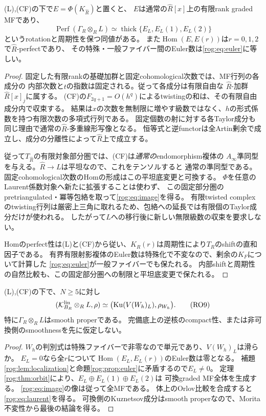 \begin{lemma}[有限対象への制限とLaurent局所化]\label{rog:lem:localization}
\textup{(L),(CF)}の下で$E=\Phi(K_{\widehat R})$と置くと、
$E$は通常の$\widehat R[x]$上の有限rank graded MFであり、
\[
 \operatorname{Perf}(\Gamma_R\otimes_RL)
 \simeq\operatorname{thick}\{E_L,E_L(1),E_L(2)\}
 \tag{RO8}\label{rog:eq:image}
\]
というrotationと周期性を保つ同値がある。
また$\operatorname{Hom}(E,E(r))$は$r=0,1,2$で$\widehat R$-perfectであり、
その特殊・一般ファイバー間のEuler数は\eqref{rog:eq:euler}に等しい。
\end{lemma}
\begin{proof}
固定した有限rankの基礎加群と固定cohomological次数では、MF行列の各成分の
内部次数と$t$の指数は固定される。従って各成分は有限自由な
$\widehat R$-加群$\widehat R[x]_j$に属する。
(CF)の$F_{2q+1}=O(h^q)$によるtwistingの和は、その有限自由成分内で収束する。
結果は$x$の次数を無制限に増やす級数ではなく、$h$の形式係数を持つ有限次数の多項式行列である。
固定個数の射に対する各Taylor成分も同じ理由で通常の$\widehat R$-多重線形写像となる。
恒等式と逆functorは全Artin剰余で成立し、成分の分離性によって$\widehat R$上で成立する。

従って$T_{\widehat R}$の有限対象部分圏では、(CF)は\emph{通常の}endomorphism複体の
$A_\infty$準同型を与える。$\widehat R\to L$は平坦なので、これをテンソルすると
通常の準同型である。固定cohomological次数のHomの形成はこの平坦底変更と可換する。
$\Phi$を任意のLaurent係数対象へ新たに拡張することは使わず、
この固定部分圏のpretriangulated・冪等包絡を取って\eqref{rog:eq:image}を得る。
有限twisted complexのtwisting行列は厳密上三角に取れるため、包絡への延長では有限個のTaylor成分だけが使われる。
したがって$L$への移行後に新しい無限級数の収束を要求しない。

Homのperfect性は(L)と(CF)から従い、$K_R(r)$は周期性により$T_R$のshiftの直和因子である。
有界有限射影複体のEuler数は特殊化で不変なので、剰余の$K_F$について計算した
\eqref{rog:eq:euler}が一般ファイバーでも保たれる。
内部shiftと周期性の自然比較も、この固定部分圏への制限と平坦底変更で保たれる。
\end{proof}

\begin{theorem}[Laurent体上の生成性と可換復元]\label{rog:thm:laurent}
\textup{(L),(CF)}の下で、$N\ge5$に対し
\[
 (\mathcal K^{\rm lin}_{B_R}\otimes_RL,\rho)
 \simeq\bigl(\operatorname{Ku}(V(W_h)_L),\rho_{W_h}\bigr).
 \tag{RO9}\label{rog:eq:laurent}
\]
特に$\Gamma_R\otimes_RL$はsmooth properである。
完備底上の逆核のcompact性、または非可換側のsmoothnessを先に仮定しない。
\end{theorem}
\begin{proof}
$W_h$の判別式は特殊ファイバーで非零なので単元であり、$V(W_h)_L$は滑らか。
$E_L=0$なら全$r$について$\operatorname{Hom}(E_L,E_L(r))$のEuler数は零となる。
補題\ref{rog:lem:localization}と命題\ref{rog:prop:euler}に矛盾するので$E_L\ne0$。
定理\ref{rog:thm:orbit}により、$E_L\oplus E_L(1)\oplus E_L(2)$は
可換graded MF全体を生成する。
\eqref{rog:eq:image}の像は従って全MFである。
体上のOrlov比較を合成すると\eqref{rog:eq:laurent}を得る。
可換側のKuznetsov成分はsmooth properなので、Morita不変性から最後の結論を得る。
\end{proof}


